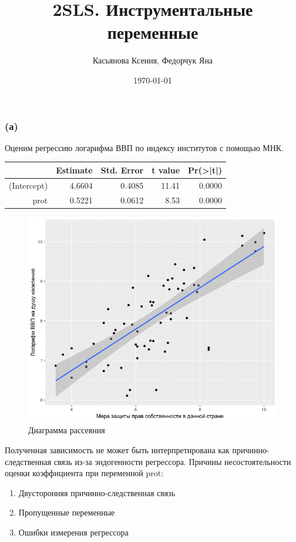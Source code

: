 \documentclass[a4paper,12pt]{article} %
\author{Касьянова Ксения, Федорчук Яна  }
\title{2SLS. Инструментальные переменные}
\date{\today}
\begin{document}
\maketitle

\subsubsection*{(а)}	
	
Оценим регрессию логарифма ВВП по индексу институтов с помощью МНК.
	
	
\begin{table}[h!]
	\centering
	\begin{tabular}{rrrrr}
		\hline
		& Estimate & Std. Error & t value & Pr(>|t|) \\ 
		\hline
		(Intercept) & 4.6604 & 0.4085 & 11.41 & 0.0000 \\ 
		prot & 0.5221 & 0.0612 & 8.53 & 0.0000 \\ 
		\hline
	\end{tabular}
\end{table}	
	
\begin{figure}[h!]
	\centering
	\includegraphics[width=0.7\linewidth]{Rplot1}
	\caption[Диаграмма рассеяния]{Диаграмма рассеяния}
	\label{fig:rplot1}
\end{figure}



Полученная зависимость не может быть интерпретирована как
причинно-следственная связь из-за  эндогенности  регрессора. 
Причины несостоятельности оценки коэффициента при переменной prot:
\begin{enumerate}
	\item Двусторонняя причинно-следственная связь
\item Пропущенные переменные
\item Ошибки измерения регрессора
\end{enumerate}	
	
\end{document}
